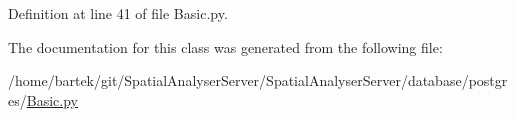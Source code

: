 \hypertarget{classdatabase_1_1postgres_1_1Basic_1_1PostgresBasic_ac62b73e044b650f2663895d2c782a93a}{
\subsubsection[{user}]{}}
\label{classdatabase_1_1postgres_1_1Basic_1_1PostgresBasic_ac62b73e044b650f2663895d2c782a93a}


Definition at line 41 of file Basic.py.



The documentation for this class was generated from the following file:\begin{DoxyCompactItemize}
\item 
/home/bartek/git/SpatialAnalyserServer/SpatialAnalyserServer/database/postgres/\hyperlink{Basic_8py}{Basic.py}\end{DoxyCompactItemize}

